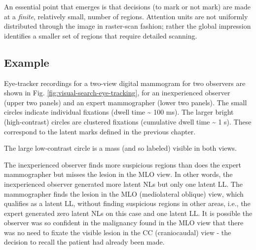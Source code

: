 \documentclass[
]{book}
\begin{document}
An essential point that emerges is that decisions (to mark or not mark) are made at a \emph{finite}, relatively small, number of regions. Attention units are not uniformly distributed through the image in raster-scan fashion; rather the global impression identifies a smaller set of regions that require detailed scanning.

\hypertarget{visual-search-example}{%
\subsection{Example}\label{visual-search-example}}

Eye-tracker recordings for a two-view digital mammogram for two observers are shown in Fig. \ref{fig:visual-search-eye-tracking}, for an inexperienced observer (upper two panels) and an expert mammographer (lower two panels). The small circles indicate individual fixations (dwell time \textasciitilde{} 100 ms). The larger bright (high-contrast) circles are clustered fixations (cumulative dwell time \textasciitilde{} 1 s). These correspond to the latent marks defined in the previous chapter.

The large low-contrast circle is a mass (and so labeled) visible in both views.

The inexperienced observer finds more suspicious regions than does the expert mammographer but misses the lesion in the MLO view. In other words, the inexperienced observer generated more latent NLs but only one latent LL. The mammographer finds the lesion in the MLO (mediolateral oblique) view, which qualifies as a latent LL, without finding suspicious regions in other areas, i.e., the expert generated zero latent NLs on this case and one latent LL. It is possible the observer was so confident in the malignancy found in the MLO view that there was no need to fixate the visible lesion in the CC (craniocaudal) view - the decision to recall the patient had already been made.
\end{document}
